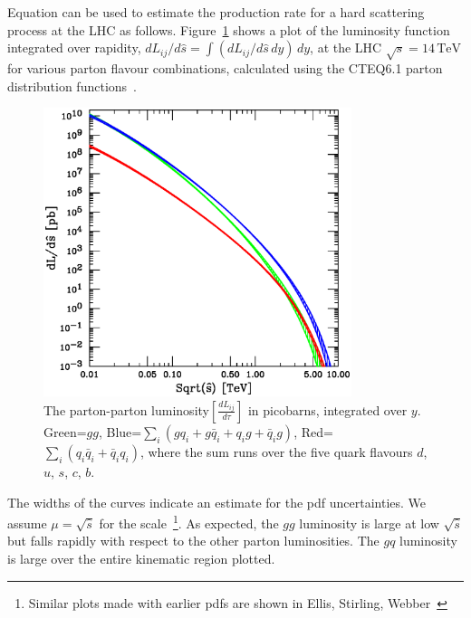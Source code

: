 \documentclass[12pt]{iopart}
\begin{document}
Equation  can be used to estimate the production rate for a  hard scattering process at the LHC
as follows.  Figure~\ref{fig:figlum4} shows a plot of the luminosity function integrated  over rapidity,
$dL_{ij}/d\hat{s} = \int (dL_{ij}/d\hat{s}\,dy) \, dy$, at the LHC $\sqrt{s} = 14 \, \mathrm{TeV}$ for various
parton flavour combinations, calculated using the CTEQ6.1 parton distribution  functions~\cite{Stump:2003yu}. 
%
\begin{figure}[t]
\begin{center}
\includegraphics[width=9cm]{figlum4.ps}
\end{center}
\caption{
The parton-parton luminosity$\left[\frac{dL_{ij}}{d\tau}\right]$ 
in picobarns,
integrated over $y$. 
Green=$gg$, 
Blue=$\sum_i (gq_i+g{\bar q}_i+q_ig+{\bar q}_ig)$,
Red=$\sum_i (q_i{\bar q}_i+{\bar q}_iq_i)$,
where the sum runs over the five quark flavours $d$, $u$, $s$, $c$, $b$.
} 
\label{fig:figlum4}
\end{figure}
%
The widths of the curves indicate an estimate  for the pdf uncertainties.  We assume $\mu = \sqrt{\hat{s}}$ for
the scale~\footnote{
Similar plots made with earlier pdfs are shown in Ellis, Stirling, Webber~\cite{Ellis:1991qj}}.
As expected, the $gg$ luminosity is large at low $\sqrt{\hat{s}}$ but falls rapidly with respect to the other
parton luminosities. The $gq$ luminosity is large over the entire kinematic region plotted. 
\end{document}
